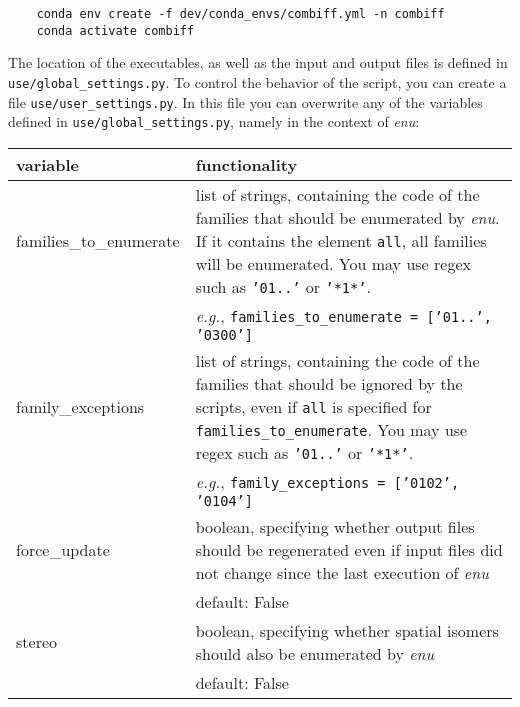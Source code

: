\documentclass[a4paper,11pt]{article}
\begin{document}
\begin{verbatim}
    conda env create -f dev/conda_envs/combiff.yml -n combiff
    conda activate combiff
\end{verbatim}

The location of the executables, as well as the input and output files is defined in \texttt{use/global\_settings.py}. To control the behavior of the script, you can create a file \texttt{use/user\_settings.py}. In this file you can overwrite any of the variables defined in \texttt{use/global\_settings.py}, namely in the context of \textit{enu}:

\begin{table}[H]
\begin{tabular}{>{\ttfamily\raggedright}p{}|p{}}
    \hline
    \textnormal{variable} & functionality \\
    \hline\hline
    families\_to\_enumerate & list of strings, containing the code of the families that should be enumerated by \textit{enu}. If it contains the element \texttt{all}, all families will be enumerated. You may use regex such as \texttt{'01..'} or \texttt{'*1*'}.\\
    & \textit{e.g.}, \texttt{families\_to\_enumerate = ['01..', '0300']}\\
    \hline
    family\_exceptions & list of strings, containing the code of the families that should be ignored by the scripts, even if \texttt{all} is specified for \texttt{families\_to\_enumerate}. You may use regex such as \texttt{'01..'} or \texttt{'*1*'}.\\
    & \textit{e.g.}, \texttt{family\_exceptions = ['0102', '0104']}\\
    \hline
    force\_update & boolean, specifying whether output files should be regenerated even if input files did not change since the last execution of \textit{enu}\\
    & default: False\\
    \hline
    stereo & boolean, specifying whether spatial isomers should also be enumerated by \textit{enu}\\
    & default: False\\
    \hline
\end{tabular}
\end{table}


\renewcommand\bibname{References}


\end{document}
